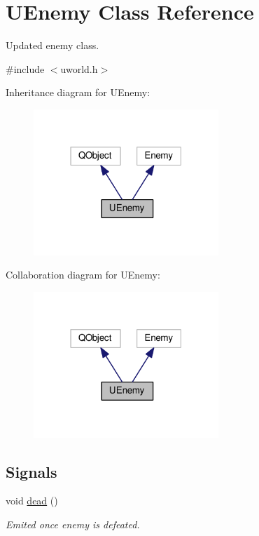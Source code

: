 \hypertarget{classUEnemy}{}\section{U\+Enemy Class Reference}
\label{classUEnemy}


Updated enemy class.  




{\ttfamily \#include $<$uworld.\+h$>$}



Inheritance diagram for U\+Enemy\+:\nopagebreak
\begin{figure}[H]
\begin{center}
\leavevmode
\includegraphics[width=198pt]{da/d90/classUEnemy__inherit__graph}
\end{center}
\end{figure}


Collaboration diagram for U\+Enemy\+:\nopagebreak
\begin{figure}[H]
\begin{center}
\leavevmode
\includegraphics[width=198pt]{d5/d7a/classUEnemy__coll__graph}
\end{center}
\end{figure}
\subsection*{Signals}
\begin{DoxyCompactItemize}
\item 
void \hyperlink{classUEnemy_aa00c76b00d33570ade0136e60beaf9a5}{dead} ()\hypertarget{classUEnemy_aa00c76b00d33570ade0136e60beaf9a5}{}\label{classUEnemy_aa00c76b00d33570ade0136e60beaf9a5}

\begin{DoxyCompactList}\small\item\em Emited once enemy is defeated. \end{DoxyCompactList}\end{DoxyCompactItemize}
